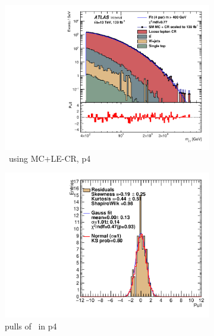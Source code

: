 \begin{figure}[H]
    \centering
    \begin{subfigure}[h]{0.38\linewidth}
    \includegraphics[scale=0.3]{figs/ch6/fit/variable_nosmooth/p4/10PB/output_SMMCplusCR_Mjg_p4.pdf}%
    \caption{\mjph \ using MC+LE-CR, p4}
    \end{subfigure}
    \hfill
    \begin{subfigure}[h]{0.4\linewidth}
    \includegraphics[scale=0.32]{figs/ch6/fit/variable_nosmooth/p4/10PB/pull_SMMCplusCR_Mjg_p4.pdf}%
    \caption{pulls of \mjph \ in p4}
    \end{subfigure}
    \hfill
    \begin{subfigure}[h]{0.38\linewidth}

\end{subfigure}
\end{figure}
